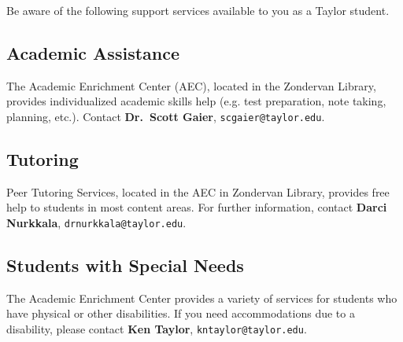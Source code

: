 Be aware of the following support services
available to you as a Taylor student.

\subsection{Academic Assistance}

The Academic Enrichment Center (AEC), located in the Zondervan Library,
provides individualized academic skills help
(e.g. test preparation, note taking, planning, etc.).
Contact \textbf{Dr.\ Scott Gaier}, \texttt{scgaier@taylor.edu}.
 
\subsection{Tutoring}

Peer Tutoring Services,
located in the AEC in Zondervan Library,
provides free help to students in most content areas.
For further information, contact
\textbf{Darci Nurkkala}, \texttt{drnurkkala@taylor.edu}.

\subsection{Students with Special Needs}

The Academic Enrichment Center provides a variety of services
for students who have physical or other disabilities.
If you need accommodations due to a disability, please contact
\textbf{Ken Taylor}, \texttt{kntaylor@taylor.edu}.

